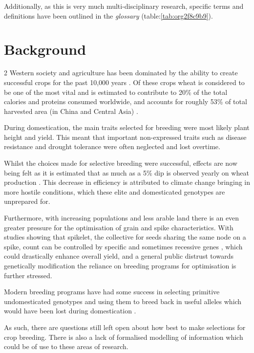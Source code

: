 \documentclass[11pt]{report}
\begin{document}
Additionally, as this is very much multi-disciplinary research, specific terms and definitions have been outlined in the \emph{glossary} (table:\ref{tab:org2f8c9b9}).

\section{Background}
\label{sec:org48b06b3}
2
   Western society and agriculture has been dominated by the ability to create successful crops for the past 10,000 years \cite{Ozkan2002}. Of these crops wheat is considered to be one of the most vital and is estimated to contribute to 20\% of the total calories and proteins consumed worldwide, and accounts for roughly 53\% of total harvested area (in China and Central Asia) \cite{Shiferaw2013}.

During domestication, the main traits selected for breeding were most likely plant height and yield. This meant that important non-expressed traits such as disease resistance and drought tolerance were often neglected and lost overtime.

Whilst the choices made for selective breeding were successful, effects are now being felt as it is estimated that as much as a 5\% dip is observed yearly on wheat production \cite{Shiferaw2013}. This decrease in efficiency is attributed to climate change bringing in more hostile conditions, which these elite and  domesticated genotypes are unprepared for.

Furthermore, with increasing populations and less arable land there is an even greater pressure for the optimisation of grain and spike characteristics. With studies showing that spikelet, the collective for seeds sharing the same node on a spike, count can be controlled by specific and sometimes recessive genes \cite{Finnegan2018}, which could drastically enhance overall yield, and a general public distrust towards genetically modification \cite{Aleksejeva2014,Twardowski2015,Lynas} the reliance on breeding programs for optimisation is further stressed.

Modern breeding programs have had some success in selecting primitive undomesticated genotypes and using them to breed back in useful alleles which would have been lost during domestication \cite{Charmet2011}.

As such, there are questions still left open about how best to make selections for crop breeding. There is also a lack of formalised modelling of information which could be of use to these areas of research.
\end{document}
